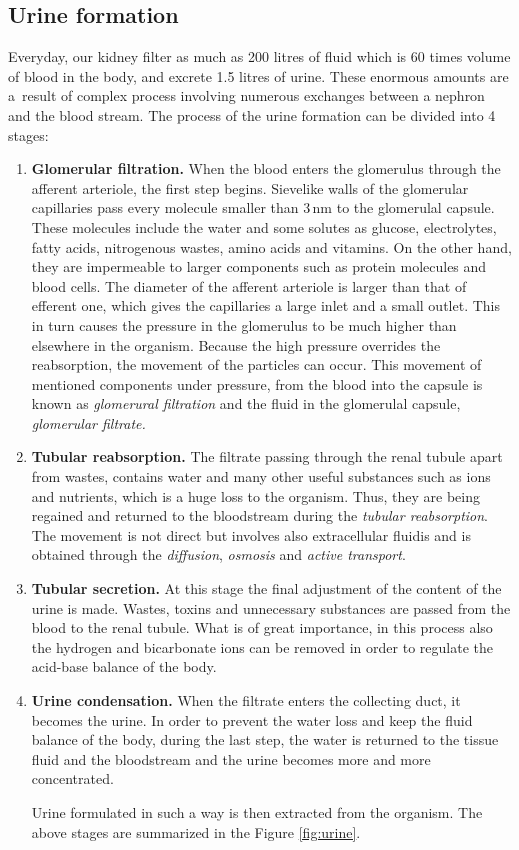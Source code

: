 \subsection{Urine formation} 
Everyday, our kidney filter as much as 200 litres of fluid which is 60 times volume of blood in the body, and excrete 1.5 litres of urine. These enormous amounts are a~result of complex process involving numerous exchanges between a nephron and the blood stream. The process of the urine formation can be divided into 4 stages:
\begin{enumerate}
\item{\textbf{Glomerular filtration.}} When the blood enters the glomerulus through the afferent arteriole, the first step begins. Sievelike walls of the glomerular capillaries  pass every molecule smaller than 3\,nm to the glomerulal capsule. These molecules include the water and some solutes as glucose, electrolytes, fatty acids, nitrogenous wastes, amino acids and vitamins. On the other hand, they are impermeable to larger components such as protein molecules and blood cells.  The diameter of the afferent arteriole is larger than that of efferent one, which gives the capillaries a large inlet and a small outlet. This in turn causes the pressure in the glomerulus to be much higher than elsewhere in the organism. Because the high pressure overrides the reabsorption, the movement of the particles can occur. This movement  of  mentioned components   under  pressure, from  the  blood  into  the  capsule is known as \textit{glomerural filtration} and the fluid in the glomerulal capsule, \textit{glomerular filtrate.} 

  
\item{\textbf{Tubular reabsorption.}} The filtrate passing through the renal tubule apart from wastes, contains water and many other useful substances such as ions and nutrients, which is a huge loss to the organism. Thus, they are being regained and returned to the bloodstream during the \textit{tubular reabsorption}. The movement is not direct but involves also extracellular fluidis and is obtained through the \textit{diffusion}, \textit{osmosis} and \textit{active transport}. 
 
\item{\textbf{Tubular secretion.}} At this stage the final adjustment of the content of the urine is made. Wastes, toxins and unnecessary substances are passed from the blood to the renal tubule. What is of great importance, in this process also the hydrogen and bicarbonate ions can be removed in order to regulate the acid-base balance of the body.

\item{\textbf{Urine condensation.}} When the filtrate enters the collecting duct, it becomes the urine. In order to prevent the water loss and keep the fluid balance of the body, during the last step, the water is returned to the tissue fluid and the bloodstream and the urine becomes more and more concentrated.

Urine formulated in such a way is then extracted from the organism. The above stages are summarized in the Figure \ref{fig:urine}.

\end{enumerate}

